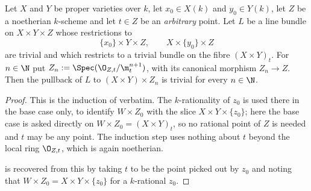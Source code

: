 \begin{lemma}\label{lem:cube-thickening-trivial-fibre}
Let $X$ and $Y$ be proper varieties over $k$, let $x_0\in X(k)$ and
$y_0\in Y(k)$, let $Z$ be a noetherian $k$-scheme and let $t\in Z$ be an
\emph{arbitrary} point.  Let $L$ be a line bundle on $X\times Y\times Z$ whose
restrictions to
\[
  \{x_0\}\times Y\times Z,\qquad
  X\times\{y_0\}\times Z
\]
are trivial and which restricts to a trivial bundle on the fibre
$(X\times Y)_t$.  For $n\in\N$ put $Z_n:=\Spec(\O_{Z,t}/\m_t^{n+1})$, with its
canonical morphism $Z_n\to Z$.  Then the pullback of $L$ to
$(X\times Y)\times Z_n$ is trivial for every $n\in\N$.
\end{lemma}
\begin{proof}
This is the induction of  verbatim.  The
$k$-rationality of $z_0$ is used there in the base case only, to identify
$W\times Z_0$ with the slice $X\times Y\times\{z_0\}$; here the base case is
asked directly on $W\times Z_0=(X\times Y)_t$, so no rational point of $Z$ is
needed and $t$ may be any point.  The induction step uses nothing about $t$
beyond the local ring $\O_{Z,t}$, which is again noetherian.

 is recovered from this by taking
$t$ to be the point picked out by $z_0$ and noting that
$W\times Z_0=X\times Y\times\{z_0\}$ for a $k$-rational $z_0$.
\end{proof}

